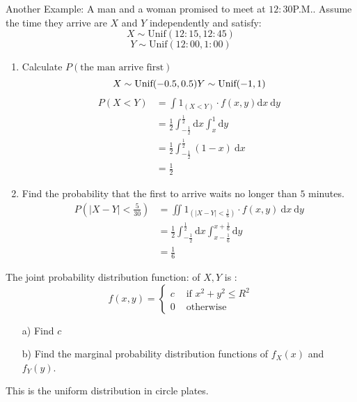 \documentclass{article}
\begin{document}
Another Example: A man and a woman promised to meet at $12:30$P.M.. Assume the time they arrive are $X$ and $Y$ independently and satisfy:
$$ X \sim \text{Unif}(12:15, 12:45) $$
$$ Y \sim \text{Unif}(12:00, 1:00) $$
\begin{enumerate}
    \item Calculate $P(\text{the man arrive first})$
    \begin{equation*}
        X \sim \text{Unif}(-0.5, 0.5)\\
        Y \sim \text{Unif}(-1, 1)
    \end{equation*}
    \begin{align*}
        P(X<Y) &= \int 1_{(X<Y)} \cdot f(x,y) \text{d}x \: \text{d}y\\
               &= \frac{1}{2} \int_{-\frac{1}{2}}^{\frac{1}{2}} \text{d}x \int_{x}^{1} \text{d}y\\
               &= \frac{1}{2} \int_{-\frac{1}{2}}^{\frac{1}{2}} (1-x) \ \text{d}x\\
               &= \frac{1}{2}
    \end{align*}
    \item Find the probability that the first to arrive waits no longer than $5$ minutes.
    \begin{align*}
        P(|X-Y| < \frac{5}{30}) &= \iint 1_{(|X-Y|<\frac{1}{6})} \cdot f(x,y) \ \text{d}x \: \text{d}y\\
                                &= \frac{1}{2} \int_{-\frac{1}{2}}^{\frac{1}{2}} \text{d}x \int_{x-\frac{1}{6}}^{x+\frac{1}{6}} \text{d}y\\
                                &= \frac{1}{6}
    \end{align*}
\end{enumerate}


\begin{quiz}
    The joint probability distribution function: of $X,Y$ is :
    \[
    f(x,y) = 
    \begin{cases}
        c & \text{ if } x^2 + y^2 \leq R^2\\
        0 & \text{ otherwise }
    \end{cases}
    \]
    \begin{enumerate}
        \item[a)] Find $c$
        \item[b)] Find the marginal probability distribution functions of $f_X(x)$ and $f_Y(y)$.
    \end{enumerate}
\end{quiz}
This is the uniform distribution in circle plates.
\end{document}
